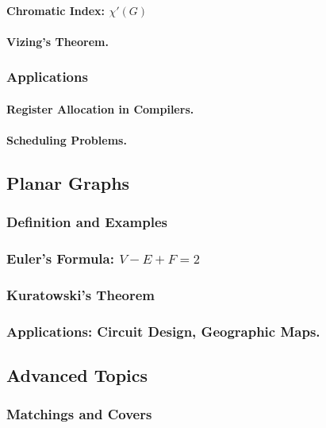 \paragraph{Chromatic Index: $\chi'(G)$}
\paragraph{Vizing's Theorem.}

\subsubsection{Applications}
\paragraph{Register Allocation in Compilers.}
\paragraph{Scheduling Problems.}

\subsection{Planar Graphs}
\label{subsec:planar}

\subsubsection{Definition and Examples}
\subsubsection{Euler's Formula: $V - E + F = 2$}
\subsubsection{Kuratowski's Theorem}
\subsubsection{Applications: Circuit Design, Geographic Maps.}

\subsection{Advanced Topics}
\label{subsec:graph-advanced}

\subsubsection{Matchings and Covers}
